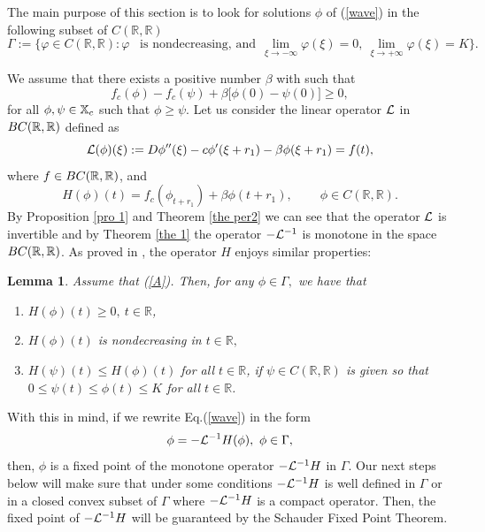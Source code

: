 \documentclass[12pt,letterpaper]{amsart}
\newtheorem{lemma}[theorem]{Lemma}
\theoremstyle{definition}
\theoremstyle{remark}
\numberwithin{equation}{section}
\begin{document}
\bigskip
The main purpose of this section is to look for solutions $\phi$ of
(\ref{wave}) in the following subset of
$C(\mathbb{R},\mathbb{R})$
\[
\Gamma:=\{\varphi\in
C(\mathbb{R},\mathbb{R}):\varphi\;\;\;\mbox{is
nondecreasing, and}\ \ \lim_{\xi\rightarrow-\infty}\varphi(\xi)=0
,\ \lim_{\xi\rightarrow+\infty}\varphi(\xi)={K}\} .
\]

\bigskip
We assume that 
there exists a positive number $\beta$ with such that
\begin{equation}\label{A}
f_{c}(\phi)-f_{c}(\psi)+\beta\lbrack\phi(0)-\psi(0)]\geq 0,
\end{equation}
for all $\phi , \psi \in \X_c$ such that $\phi \ge \psi$. Let us consider the linear operator ${\cal L}$ in $BC(\R,\R)$ defined as
\begin{equation}\label{oper L}
{\cal L}(\phi)(\xi):= D\phi'' (\xi)-c\phi' (\xi+r_1)-\beta \phi(\xi +r_1)=f(t),
\end{equation}
where $f\in BC(\R,\R )$, and 
\begin{equation}\label{A2}
H(\phi)(t)=f_{c}(\phi_{t+r_1})+\beta\phi(t+r_1),\;\;\;\;\;\;\;\;\phi\in C(\mathbb{R}%
,\mathbb{R}).
\end{equation}
By Proposition \ref{pro 1} and Theorem \ref{the per2} we can see that the operator ${\cal L}$ is invertible and by Theorem \ref{the 1}  the operator $-{\cal L}^{-1}$ is monotone in the space $BC(\R,\R)$.  
As proved in \cite{wuzou}, the operator $H$ enjoys similar properties:

\begin{lemma}
\label{lem 3.1} Assume that (\ref{A}). Then, for
any $\phi\in\Gamma,$ we have that
\begin{enumerate}
\item $H(\phi)(t)\ge 0,\ t\in\mathbb{R}$,
\item $H(\phi)(t)$ is nondecreasing in $t\in\mathbb{R,}$
\item $H(\psi)(t)\le H(\phi)(t)$ for all $t\in\mathbb{R}$, if $\psi\in
C(\mathbb{R},\mathbb{R})$ is given so that
$0\le \psi(t)\leq \phi(t)\le K$ for all
$t\in\mathbb{R}$.
\end{enumerate}
\end{lemma}
With this in mind, if we rewrite Eq.(\ref{wave}) in the form
\begin{equation}\label{fixed point}
\phi = -{\cal L}^{-1}H(\phi) , \ \phi \in \Gamma ,
\end{equation}
then, $\phi$ is a fixed point of the monotone operator $ -{\cal L}^{-1}H$ in $\Gamma$. Our next steps below will make sure that under some conditions $ -{\cal L}^{-1}H$ is well defined in $\Gamma$ or in a closed convex subset of $\Gamma$ where $-{\cal L}^{-1}H$ is a compact operator. Then, the fixed point of $-{\cal L}^{-1}H$ will be guaranteed by the Schauder Fixed Point Theorem. 
\end{document}
